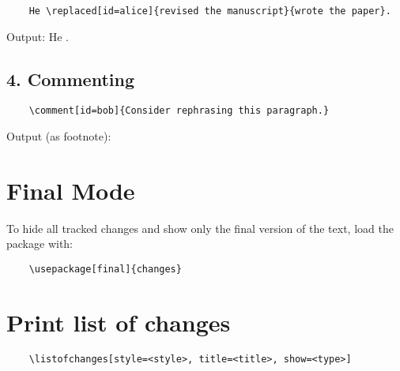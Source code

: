 \documentclass{article}
\begin{document}
\begin{Verbatim}
	He \replaced[id=alice]{revised the manuscript}{wrote the paper}.
\end{Verbatim}

Output:
He .

\vspace{1em}

\subsection*{4. Commenting}

\begin{Verbatim}
	\comment[id=bob]{Consider rephrasing this paragraph.}
\end{Verbatim}

Output (as footnote):

\vspace{1em}

\section*{Final Mode}

To hide all tracked changes and show only the final version of the text, load the package with:

\begin{Verbatim}
	\usepackage[final]{changes}
\end{Verbatim}

\section*{Print list of changes}

\begin{Verbatim}
	\listofchanges[style=<style>, title=<title>, show=<type>]
\end{Verbatim}

\listofchanges[title={List of Changes}]
\end{document}
